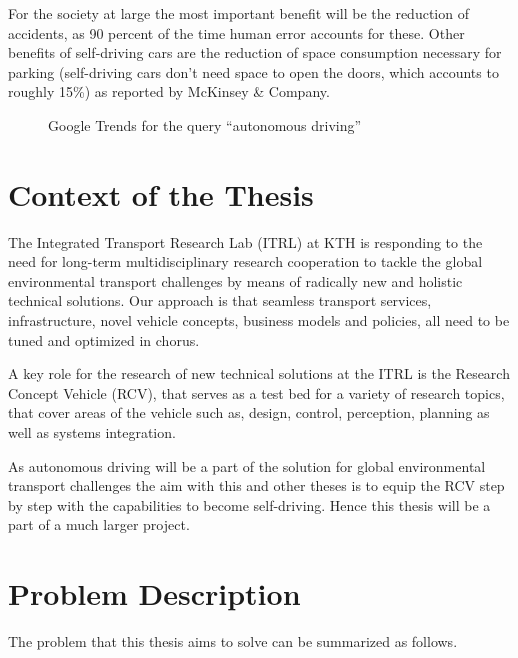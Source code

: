 For the society at large the most important benefit will be the reduction of accidents, as 90 percent of the time human error accounts for these. Other benefits of self-driving cars are the reduction of space consumption necessary for parking (self-driving cars don't need space to open the doors, which accounts to roughly 15\%) as reported by McKinsey \& Company. \cite{Bertoncello.2015}

\begin{figure}[h]
\caption{Google Trends for the query ``autonomous driving''}
\label{fig:googleTrends}
\end{figure}

\section{Context of the Thesis}
The Integrated Transport Research Lab (ITRL) at KTH is responding to the need for long-term multidisciplinary research cooperation to tackle the global environmental transport challenges by means of radically new and holistic technical solutions. Our approach is that seamless transport services, infrastructure, novel vehicle concepts, business models and policies, all need to be tuned and optimized in chorus.

A key role for the research of new technical solutions at the ITRL is the Research Concept Vehicle (RCV), that serves as a test bed for a variety of research topics, that cover areas of the vehicle such as, design, control, perception, planning as well as systems integration.

As autonomous driving will be a part of the solution for global environmental transport challenges the aim with this and other theses is to equip the RCV step by step with the capabilities to become self-driving. Hence this thesis will be a part of a much larger project.

\section{Problem Description} \label{sec:problemDescription}
The problem that this thesis aims to solve can be summarized as follows.

